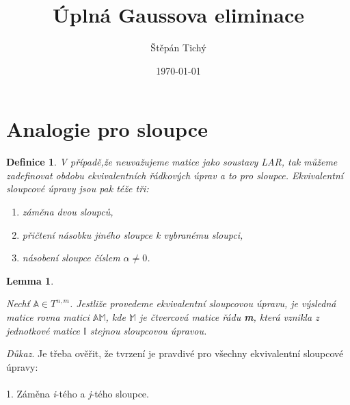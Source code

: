 \documentclass[12pt]{article}
\newtheorem{lemma}[theorem]{Lemma}
\newtheorem{defn}[theorem]{Definice}
\begin{document}
\title{Úplná Gaussova eliminace}
\author{Štěpán Tichý}
\date{\today}

\maketitle

\section{Analogie pro sloupce}
\begin{defn}
\label{defn1}
V případě,že neuvažujeme matice jako soustavy LAR, tak můžeme zadefinovat obdobu ekvivalentních řádkových úprav a to pro sloupce. Ekvivalentní sloupcové úpravy jsou pak téže tři:
\begin{enumerate}
\item záměna dvou sloupců,
\item přičtení násobku jiného sloupce k vybranému sloupci,
\item násobení sloupce číslem $\alpha \neq 0$.
\end{enumerate}
\end{defn}
\thispagestyle{empty}
\begin{lemma}
\label{lma1}

Nechť $\mathbb{A} \in T^{n,m}$. Jestliže provedeme ekvivalentní sloupcovou úpravu, je výsledná matice rovna matici $\mathbb{AM}$, kde $\mathbb{M}$ je čtvercová matice řádu \textbf{m}, která vznikla z jednotkové matice $\mathbb{I}$ stejnou sloupcovou úpravou.\\
\end{lemma}
\textit{Důkaz}. Je třeba ověřit, že tvrzení je pravdivé pro všechny ekvivalentní sloupcové úpravy:
\\
\\
1. Záměna \textit{i}-tého a \textit{j}-tého sloupce.
\\
\\
\end{document}
